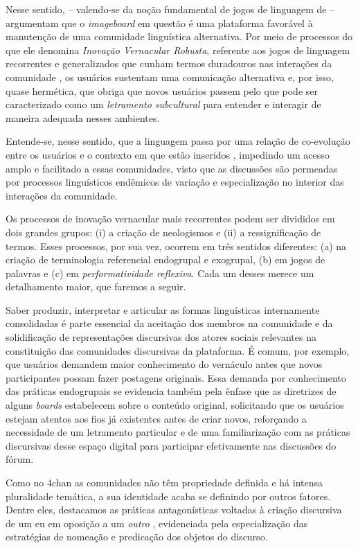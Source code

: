 \documentclass[portuguese]{textolivre}
\begin{document}
Nesse sentido, \textcite{peeters2021vernacular} – valendo-se da noção fundamental de jogos de linguagem de \textcite{witt1958} – argumentam que o \emph{imageboard} em questão é uma plataforma favorável à manutenção de uma comunidade linguística alternativa. Por meio de processos do que ele denomina \emph{Inovação Vernacular Robusta}, referente aos jogos de linguagem recorrentes e generalizados que cunham termos duradouros nas interações da comunidade \cite{peeters2021vernacular}, os usuários sustentam uma comunicação alternativa e, por isso, quase hermética, que obriga que novos usuários passem pelo que pode ser caracterizado como um \emph{letramento subcultural} para entender e interagir de maneira adequada nesses ambientes. 

Entende-se, nesse sentido, que a linguagem passa por uma relação de co-evolução entre os usuários e o contexto em que estão inseridos \cite{peeters2021vernacular}, impedindo um acesso amplo e facilitado a essas comunidades, visto que as discussões são permeadas por processos linguísticos endêmicos de variação e especialização no interior das interações da comunidade.

Os processos de inovação vernacular mais recorrentes podem ser divididos em dois grandes grupos: (i) a criação de neologismos e (ii) a ressignificação de termos. Esses processos, por sua vez, ocorrem em três sentidos diferentes: (a) na criação de terminologia referencial endogrupal e exogrupal, (b) em jogos de palavras e (c) em \emph{performatividade reflexiva}. Cada um desses merece um detalhamento maior, que faremos a seguir.

Saber produzir, interpretar e articular as formas linguísticas internamente consolidadas é parte essencial da aceitação dos membros na comunidade e da solidificação de representações discursivas dos atores sociais relevantes na constituição das comunidades discursivas da plataforma. É comum, por exemplo, que usuários demandem maior conhecimento do vernáculo antes que novos participantes possam fazer postagens originais. Essa demanda por conhecimento das práticas endogrupais se evidencia também pela ênfase que as diretrizes de alguns \emph{boards} estabelecem sobre o conteúdo original, solicitando que os usuários estejam atentos aos fios já existentes antes de criar novos, reforçando a necessidade de um letramento particular e de uma familiarização com as práticas discursivas desse espaço digital para participar efetivamente nas discussões do fórum. 

Como no 4chan as comunidades não têm propriedade definida e há intensa pluralidade temática, a sua identidade acaba se definindo por outros fatores. Dentre eles, destacamos as práticas antagonísticas voltadas à criação discursiva de um eu em oposição a um \emph{outro} \cite{tutershagen2020they, elley2021rebirth}, evidenciada pela especialização das estratégias de nomeação e predicação dos objetos do discurso.
\end{document}
